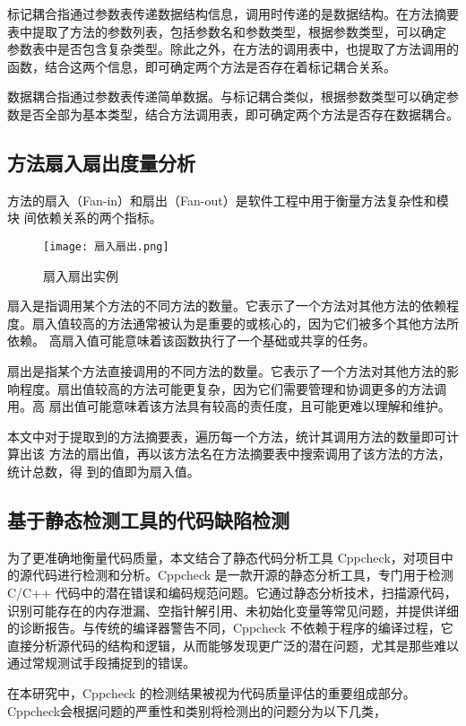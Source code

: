 标记耦合指通过参数表传递数据结构信息，调用时传递的是数据结构。在方法摘要
表中提取了方法的参数列表，包括参数名和参数类型，根据参数类型，可以确定
参数表中是否包含复杂类型。除此之外，在方法的调用表中，也提取了方法调用的
函数，结合这两个信息，即可确定两个方法是否存在着标记耦合关系。


数据耦合指通过参数表传递简单数据。与标记耦合类似，根据参数类型可以确定参
数是否全部为基本类型，结合方法调用表，即可确定两个方法是否存在数据耦合。
\subsection{方法扇入扇出度量分析}

方法的扇入（Fan-in）和扇出（Fan-out）是软件工程中用于衡量方法复杂性和模块
间依赖关系的两个指标。

\begin{figure}[h]
\centering
\texttt{[image: 扇入扇出.png]}
\caption{扇入扇出实例}
\end{figure}
    

扇入是指调用某个方法的不同方法的数量。它表示了一个方法对其他方法的依赖程
度。扇入值较高的方法通常被认为是重要的或核心的，因为它们被多个其他方法所依赖。
高扇入值可能意味着该函数执行了一个基础或共享的任务。


扇出是指某个方法直接调用的不同方法的数量。它表示了一个方法对其他方法的影
响程度。扇出值较高的方法可能更复杂，因为它们需要管理和协调更多的方法调用。高
扇出值可能意味着该方法具有较高的责任度，且可能更难以理解和维护。


本文中对于提取到的方法摘要表，遍历每一个方法，统计其调用方法的数量即可计算出该
方法的扇出值，再以该方法名在方法摘要表中搜索调用了该方法的方法，统计总数，得
到的值即为扇入值。

\subsection{基于静态检测工具的代码缺陷检测}

为了更准确地衡量代码质量，本文结合了静态代码分析工具 Cppcheck，对项目中的源代码进行检测和分析。Cppcheck 是一款开源的静态分析工具，专门用于检测 C/C++ 代码中的潜在错误和编码规范问题。它通过静态分析技术，扫描源代码，识别可能存在的内存泄漏、空指针解引用、未初始化变量等常见问题，并提供详细的诊断报告。与传统的编译器警告不同，Cppcheck 不依赖于程序的编译过程，它直接分析源代码的结构和逻辑，从而能够发现更广泛的潜在问题，尤其是那些难以通过常规测试手段捕捉到的错误。

在本研究中，Cppcheck 的检测结果被视为代码质量评估的重要组成部分。Cppcheck会根据问题的严重性和类别将检测出的问题分为以下几类，

